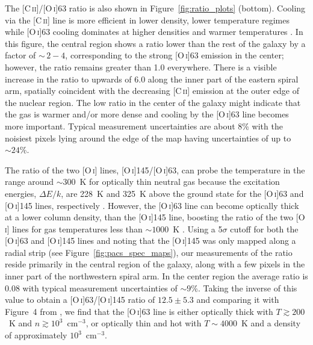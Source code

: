 \documentclass[preprint2]{aastex}
\begin{document}
The [C\,\textsc{ii}]/[O\,\textsc{i}]63 ratio is also shown in Figure~\ref{fig:ratio_plots} (bottom).  Cooling via the [C\,\textsc{ii}] line is more efficient in lower density, lower temperature regimes while [O\,\textsc{i}]63 cooling dominates at higher densities and warmer temperatures \citep{1985ApJ...291..722T}.  In this figure, the central region shows a ratio lower than the rest of the galaxy by a factor of $\sim\,2 - 4$, corresponding to the strong [O\,\textsc{i}]63 emission in the center; however, the ratio remains greater than 1.0 everywhere.  There is a visible increase in the ratio to upwards of 6.0 along the inner part of the eastern spiral arm, spatially coincident with the decreasing [C\,\textsc{ii}] emission at the outer edge of the nuclear region.  The low ratio in the center of the galaxy might indicate that the gas is warmer and/or more dense and cooling by the [O\,\textsc{i}]63 line becomes more important.  Typical measurement uncertainties are about 8\% with the noisiest pixels lying around the edge of the map having uncertainties of up to $\sim 24$\%.

The ratio of the two [O\,\textsc{i}] lines, [O\,\textsc{i}]145/[O\,\textsc{i}]63, can probe the temperature in the range around $\sim 300$~K for optically thin neutral gas because the excitation energies, $\Delta E/k$, are 228~K and 325~K above the ground state for the [O\,\textsc{i}]63 and [O\,\textsc{i}]145 lines, respectively \citep{1985ApJ...291..722T, 1999ApJ...527..795K, 2001ApJ...561..766M, 2006A&A...446..561L}.  However, the [O\,\textsc{i}]63 line can become optically thick at a lower column density, than the [O\,\textsc{i}]145 line, boosting the ratio of the two [O\,\textsc{i}] lines for gas temperatures less than $\sim 1000$~K \citep{1985ApJ...291..722T}.  Using a 5$\sigma$ cutoff for both the [O\,\textsc{i}]63 and [O\,\textsc{i}]145 lines and noting that the [O\,\textsc{i}]145 was only mapped along a radial strip (see Figure~\ref{fig:pacs_spec_maps}), our measurements of the ratio reside primarily in the central region of the galaxy, along with a few pixels in the inner part of the northwestern spiral arm.  In the center region the average ratio is 0.08 with typical measurement uncertainties of $\sim 9$\%.  Taking the inverse of this value to obtain a [O\,\textsc{i}]63/[O\,\textsc{i}]145 ratio of $12.5 \pm 5.3$ and comparing it with Figure~4 from \citet{2006A&A...446..561L}, we find that the [O\,\textsc{i}]63 line is either optically thick with $T \gtrsim 200$~K and $n \gtrsim 10^{3}$~cm$^{-3}$, or optically thin and hot with $T \sim 4000$~K and a density of approximately $10^{3}$~cm$^{-3}$.
\end{document}
